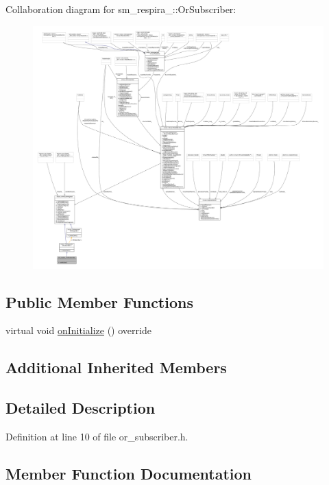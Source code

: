 Collaboration diagram for sm\+\_\+respira\+\_\+:\+:Or\+Subscriber\+:
\nopagebreak
\begin{figure}[H]
\begin{center}
\leavevmode
\includegraphics[width=350pt]{classsm__respira__1_1_1OrSubscriber__coll__graph}
\end{center}
\end{figure}
\subsection*{Public Member Functions}
\begin{DoxyCompactItemize}
\item 
virtual void \hyperlink{classsm__respira__1_1_1OrSubscriber_a085137f52045333e18eea320e52dc1f1}{on\+Initialize} () override
\end{DoxyCompactItemize}
\subsection*{Additional Inherited Members}


\subsection{Detailed Description}


Definition at line 10 of file or\+\_\+subscriber.\+h.



\subsection{Member Function Documentation}
